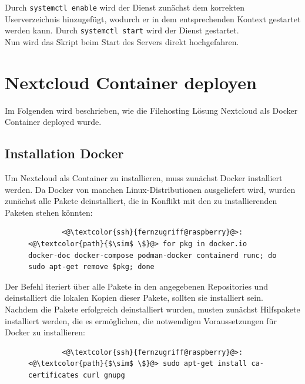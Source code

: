 \documentclass[a4paper, 11pt]{scrartcl}
\begin{document}
Durch \lstinline[basicstyle={\small\ttfamily\color{black}}]|systemctl enable| wird der Dienst zunächst dem korrekten Userverzeichnis
hinzugefügt, wodurch er in dem entsprechenden Kontext gestartet werden kann. Durch
\lstinline[basicstyle={\small\ttfamily\color{black}}]|systemctl start| wird der Dienst gestartet.
\\
Nun wird das Skript beim Start des Servers direkt hochgefahren.


\section{Nextcloud Container deployen}
Im Folgenden wird beschrieben, wie die Filehosting Lösung Nextcloud als Docker Container deployed wurde.

\subsection{Installation Docker}
Um Nextcloud als Container zu installieren, muss zunächst Docker installiert werden. Da Docker von manchen Linux-Distributionen
ausgeliefert wird, wurden zunächst alle Pakete deinstalliert, die in Konflikt mit den zu installierenden Paketen stehen könnten:
\begin{figure}[H]
    \begin{mdframed}[backgroundcolor=bbg]
        \begin{lstlisting}
        <@\textcolor{ssh}{fernzugriff@raspberry}@>:<@\textcolor{path}{$\sim$ \$}@> for pkg in docker.io docker-doc docker-compose podman-docker containerd runc; do sudo apt-get remove $pkg; done
        \end{lstlisting}
    \end{mdframed}
    \label{lst:uninstall_docker_pkg}
\end{figure}
Der Befehl iteriert über alle Pakete in den angegebenen Repositories und deinstalliert die lokalen Kopien dieser Pakete, sollten
sie installiert sein.
\\
Nachdem die Pakete erfolgreich deinstalliert wurden, musten zunächst Hilfspakete installiert werden, die es ermöglichen, die
notwendigen Voraussetzungen für Docker zu installieren:
\begin{figure}[H]
    \begin{mdframed}[backgroundcolor=bbg]
        \begin{lstlisting}
        <@\textcolor{ssh}{fernzugriff@raspberry}@>:<@\textcolor{path}{$\sim$ \$}@> sudo apt-get install ca-certificates curl gnupg
        \end{lstlisting}
    \end{mdframed}
    \label{lst:install_https_pkgs}
\end{figure}
\end{document}
